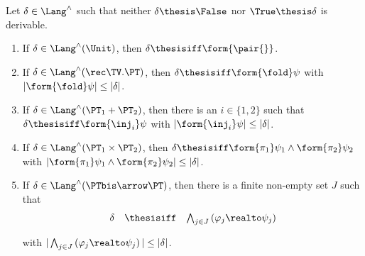 \begin{lemma}
\label{lem:proof:sem:log:compl:nf}
Let $\delta \in \Lang^\land$ such that neither $\delta \thesis \False$
nor $\True \thesis \delta$ is derivable.
\begin{enumerate}[(1)]
\item
\label{item:proof:sem:log:compl:nf:unit}
If $\delta \in \Lang^\land(\Unit)$,
then $\delta \thesisiff \form{\pair{}}$.

\item
\label{item:proof:sem:log:compl:nf:rec}
If $\delta \in \Lang^\land(\rec \TV.\PT)$,
then
$\delta \thesisiff \form{\fold}\psi$
with $|\form{\fold}\psi| \leq |\delta|$.


\item
\label{item:proof:sem:log:compl:nf:plus}
If $\delta \in \Lang^\land(\PT_1 + \PT_2)$,
then there is an $i \in \{1,2\}$
such that
$\delta \thesisiff \form{\inj_i}\psi$
with $|\form{\inj_i}\psi| \leq |\delta|$.


\item
\label{item:proof:sem:log:compl:nf:times}
If $\delta \in \Lang^\land(\PT_1 \times \PT_2)$,
then
$\delta \thesisiff \form{\pi_1}\psi_1 \land \form{\pi_2}\psi_2$
with
\(
  |\form{\pi_1}\psi_1 \land \form{\pi_2}\psi_2| \leq |\delta|
\).


\item
\label{item:proof:sem:log:compl:nf:arrow}
If $\delta \in \Lang^\land(\PTbis \arrow \PT)$,
then there is a finite non-empty set $J$ such that
\[
\begin{array}{l l l}
  \delta
& \thesisiff
& \bigwedge_{j \in J} \left(\varphi_j \realto \psi_j\right)
\end{array}
\]

\noindent
with
\(
  |\bigwedge_{j \in J} \left(\varphi_j \realto \psi_j\right)|
  \leq
  |\delta|
\).
\end{enumerate}
\end{lemma}


